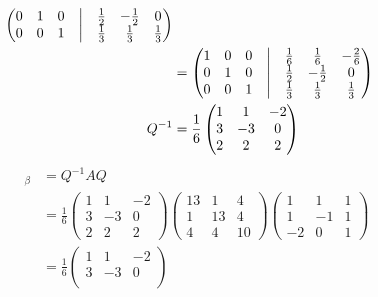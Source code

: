 \documentclass[13pt]{article}
\begin{document}
\begin{enumerate}[label=(\alph*),leftmargin=*]
\begin{align*}
\begin{pmatrix}
               0 & 1 & 0 & \bigm| & \frac{1}{2} & -\frac{1}{2} & 0 \\
               0 & 0 & 1 & \bigm| & \frac{1}{3} & \frac{1}{3} & \frac{1}{3}
             \end{pmatrix} \\
           &=
             \begin{pmatrix}
               1 & 0 & 0 & \bigm| & \frac{1}{6} & \frac{1}{6} & -\frac{2}{6} \\
               0 & 1 & 0 & \bigm| & \frac{1}{2} & -\frac{1}{2} & 0 \\
               0 & 0 & 1 & \bigm| & \frac{1}{3} & \frac{1}{3} & \frac{1}{3}
             \end{pmatrix} \\
    Q^{-1} &= \frac{1}{6}
             \begin{pmatrix}
               1 & 1 & -2 \\
               3 & -3 & 0 \\
               2 & 2 & 2
             \end{pmatrix}
  \end{align*}
  \begin{align*}
    [L_A]_\beta &= Q^{-1}AQ \\
                &= \frac{1}{6}
                  \begin{pmatrix}
                    1 & 1 & -2 \\
                    3 & -3 & 0 \\
                    2 & 2 & 2
                  \end{pmatrix}
                  \begin{pmatrix}
                    13 & 1 & 4 \\
                    1 & 13 & 4 \\
                    4 & 4 & 10
                  \end{pmatrix}
                  \begin{pmatrix}
                    1 & 1 & 1 \\
                    1 & -1 & 1 \\
                    -2 & 0 & 1
                  \end{pmatrix} \\
                &= \frac{1}{6}
                  \begin{pmatrix}
                    1 & 1 & -2 \\
                    3 & -3 & 0 \\

\end{pmatrix}
\end{align*}
\end{enumerate}
\end{document}
